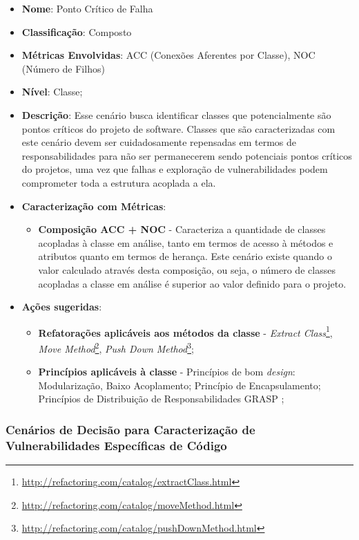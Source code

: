 \begin{itemize}
\item \textbf{Nome}: Ponto Crítico de Falha
\item \textbf{Classificação}: Composto
\item \textbf{Métricas Envolvidas}: ACC (Conexões Aferentes por Classe), NOC (Número de Filhos)
\item \textbf{Nível}: Classe;
\item \textbf{Descrição}: Esse cenário busca identificar classes que potencialmente são pontos críticos do projeto de software. Classes que são caracterizadas com este cenário devem ser cuidadosamente repensadas em termos de responsabilidades para não ser permanecerem sendo potenciais pontos críticos do projetos, uma vez que falhas e exploração de vulnerabilidades podem comprometer toda a estrutura acoplada a ela.
\item \textbf{Caracterização com Métricas}: 
	\begin{itemize}
	\item \textbf{Composição ACC + NOC} - Caracteriza a quantidade de classes acopladas à classe em análise, tanto em termos de acesso à métodos e atributos quanto em termos de herança. Este cenário existe quando o valor calculado através desta composição, ou seja, o número de classes acopladas a classe em análise é superior ao valor definido para o projeto.
	\end{itemize}
\item \textbf{Ações sugeridas}: 
	\begin{itemize}
	\item \textbf{Refatorações aplicáveis aos métodos da classe} - \emph{Extract Class}\footnote{\url{http://refactoring.com/catalog/extractClass.html}}, \emph{Move Method}\footnote{\url{http://refactoring.com/catalog/moveMethod.html}}, \emph{Push Down Method}\footnote{\url{http://refactoring.com/catalog/pushDownMethod.html}};
	\item \textbf{Princípios aplicáveis à classe} - Princípios de bom \emph{design}: Modularização, Baixo Acoplamento; Princípio de Encapsulamento; Princípios de Distribuição de Responsabilidades GRASP \cite{larman2007};
	\end{itemize}
\end{itemize}

\subsubsection{Cenários de Decisão para Caracterização de Vulnerabilidades Específicas de Código}

